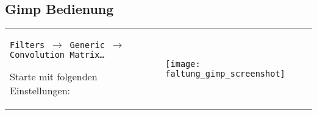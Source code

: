 \enlargethispage{2cm}
\subsection*{Gimp Bedienung}
\begin{tabularx}{1.1\linewidth}{ @{} X l @{}}
  \texttt{Filters $\rightarrow$ Generic $\rightarrow$ Convolution
    Matrix…}
  \par
  Starte mit folgenden Einstellungen:
  &
  \parbox[t]{0.45\linewidth}{
    \vspace*{-3\baselineskip}
    \texttt{[image: faltung\_gimp\_screenshot]}
  }
\end{tabularx}

